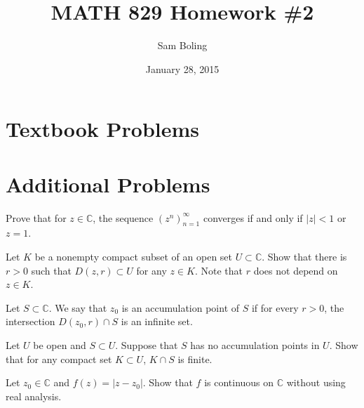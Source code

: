 \documentclass{article}
\title{MATH 829 Homework \#2}
\date{January 28, 2015}
\author{Sam Boling}
\newcounter{Problem}
\newenvironment{Problem}{\begin{Exercise}[name={Problem},
                                          counter={Problem}]}
                        {\end{Exercise}}
\begin{document}
\begin{titlepage}
\maketitle
\end{titlepage}

\section{Textbook Problems}

\section{Additional Problems}

\begin{Problem}
  Prove that for $z \in \mathbb{C}$, the sequence $(z^n)_{n=1}^\infty$
  converges if and only if $|z| < 1$ or $z = 1$.
\end{Problem}

\begin{Problem}
  Let $K$ be a nonempty compact subset of an open set
  $U  \subset \mathbb{C}$. Show that there is $r > 0$
  such that $D(z, r) \subset U$ for any $z \in K$.
  Note that $r$ does not depend on $z \in K$.
\end{Problem}

\begin{Problem}
  Let $S \subset \mathbb{C}$. We say that $z_0$ is an accumulation
  point of $S$ if for every $r > 0$, the intersection
  $D(z_0, r) \cap S$ is an infinite set.

  Let $U$ be open and $S \subset U$. Suppose that $S$ has no accumulation
  points in $U$. Show that for any compact set $K \subset U$,
  $K \cap S$ is finite.
\end{Problem}

\begin{Problem}
  Let $z_0 \in \mathbb{C}$ and $f(z) = |z - z_0|$. Show that
  $f$ is continuous on $\mathbb{C}$ without using real analysis.
\end{Problem}
\end{document}
